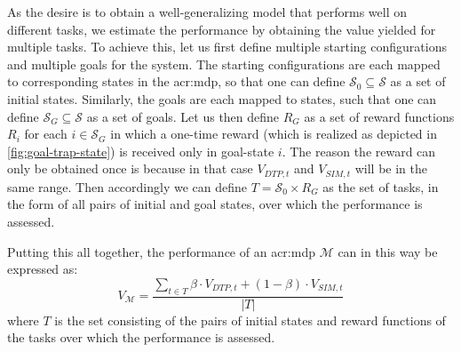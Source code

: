 As the desire is to obtain a well-generalizing model that performs well on different tasks, we estimate the performance by obtaining the value yielded for multiple tasks.
To achieve this, let us first define multiple starting configurations and multiple goals for the system.
The starting configurations are each mapped to corresponding states in the \acrshort{acr:mdp}, so that one can define $\mathcal{S}_0 \subseteq \mathcal{S}$ as a set of initial states.
Similarly, the goals are each mapped to states, such that one can define $\mathcal{S}_G \subseteq \mathcal{S}$ as a set of goals.
Let us then define $R_G$ as a set of reward functions $R_i$ for each $i \in \mathcal{S}_G$ in which a one-time reward (which is realized as depicted in \autoref{fig:goal-trap-state}) is received only in goal-state $i$.
The reason the reward can only be obtained once is because in that case $V_{\mathit{DTP}, t}$ and $V_{\mathit{SIM}, t}$ will be in the same range.
Then accordingly we can define $T = \mathcal{S_0} \times R_G$ as the set of tasks, in the form of all pairs of initial and goal states, over which the performance is assessed.

\noindent Putting this all together, the performance of an \acrshort{acr:mdp} $\mathcal{M}$ can in this way be expressed as:
\begin{equation}
\label{eq:vm}
	V_{\mathcal{M}} = \frac{\sum_{t \in T} \beta \cdot V_{\mathit{DTP}, t} + (1 - \beta) \cdot V_{\mathit{SIM}, t}}{|T|}
\end{equation}
where $T$ is the set consisting of the pairs of initial states and reward functions of the tasks over which the performance is assessed.


%


